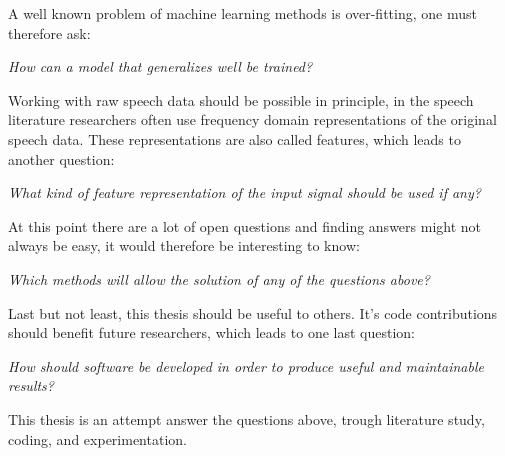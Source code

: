A well known problem of machine learning methods is over-fitting, one must therefore ask:

\noindent \textit{How can a model that generalizes well be trained?}
 

Working with raw speech data should be possible in principle, in the speech literature researchers often use frequency domain representations of the original speech data. These representations are also called features, which leads to another question:

\noindent \textit{What kind of feature representation of the input signal should be used if any?}

At this point there are a lot of open questions and finding answers might not always be easy, it would therefore be interesting to know: 

\noindent \textit{Which methods will allow the solution of any of the questions above?}

Last but not least, this thesis should be useful to others. It's code contributions should benefit future researchers, which leads to one last question:

\noindent \textit{How should software be developed in order to produce useful and maintainable results?}

This thesis is an attempt answer the questions above, trough literature study, coding, and experimentation.



